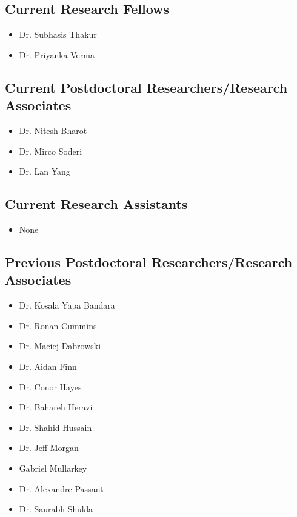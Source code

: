 \documentclass[10pt,a4paper]{res} %
\begin{document}
\begin{resume}
\subsection*{Current Research Fellows}

\begin{itemize} \itemsep -2pt
\item Dr. Subhasis Thakur
\item Dr. Priyanka Verma
\end{itemize}

\subsection*{Current Postdoctoral Researchers/Research Associates}

\begin{itemize} \itemsep -2pt
\item Dr. Nitesh Bharot
\item Dr. Mirco Soderi
\item Dr. Lan Yang
\end{itemize}

\subsection*{Current Research Assistants}

\begin{itemize} \itemsep -2pt
\item None
\end{itemize}

\subsection*{Previous Postdoctoral Researchers/Research Associates}

\begin{itemize} \itemsep -2pt
\item Dr. Kosala Yapa Bandara
\item Dr. Ronan Cummins
\item Dr. Maciej Dabrowski
\item Dr. Aidan Finn
\item Dr. Conor Hayes
\item Dr. Bahareh Heravi
\item Dr. Shahid Hussain
\item Dr. Jeff Morgan
\item Gabriel Mullarkey
\item Dr. Alexandre Passant
\item Dr. Saurabh Shukla
\end{itemize}


\end{resume}
\end{document}
